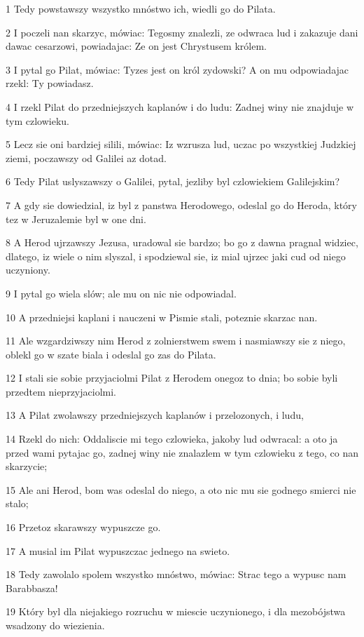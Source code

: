 \par 1 Tedy powstawszy wszystko mnóstwo ich, wiedli go do Pilata.
\par 2 I poczeli nan skarzyc, mówiac: Tegosmy znalezli, ze odwraca lud i zakazuje dani dawac cesarzowi, powiadajac: Ze on jest Chrystusem królem.
\par 3 I pytal go Pilat, mówiac: Tyzes jest on król zydowski? A on mu odpowiadajac rzekl: Ty powiadasz.
\par 4 I rzekl Pilat do przedniejszych kaplanów i do ludu: Zadnej winy nie znajduje w tym czlowieku.
\par 5 Lecz sie oni bardziej silili, mówiac: Iz wzrusza lud, uczac po wszystkiej Judzkiej ziemi, poczawszy od Galilei az dotad.
\par 6 Tedy Pilat uslyszawszy o Galilei, pytal, jezliby byl czlowiekiem Galilejskim?
\par 7 A gdy sie dowiedzial, iz byl z panstwa Herodowego, odeslal go do Heroda, który tez w Jeruzalemie byl w one dni.
\par 8 A Herod ujrzawszy Jezusa, uradowal sie bardzo; bo go z dawna pragnal widziec, dlatego, iz wiele o nim slyszal, i spodziewal sie, iz mial ujrzec jaki cud od niego uczyniony.
\par 9 I pytal go wiela slów; ale mu on nic nie odpowiadal.
\par 10 A przedniejsi kaplani i nauczeni w Pismie stali, poteznie skarzac nan.
\par 11 Ale wzgardziwszy nim Herod z zolnierstwem swem i nasmiawszy sie z niego, oblekl go w szate biala i odeslal go zas do Pilata.
\par 12 I stali sie sobie przyjaciolmi Pilat z Herodem onegoz to dnia; bo sobie byli przedtem nieprzyjaciolmi.
\par 13 A Pilat zwolawszy przedniejszych kaplanów i przelozonych, i ludu,
\par 14 Rzekl do nich: Oddaliscie mi tego czlowieka, jakoby lud odwracal: a oto ja przed wami pytajac go, zadnej winy nie znalazlem w tym czlowieku z tego, co nan skarzycie;
\par 15 Ale ani Herod, bom was odeslal do niego, a oto nic mu sie godnego smierci nie stalo;
\par 16 Przetoz skarawszy wypuszcze go.
\par 17 A musial im Pilat wypuszczac jednego na swieto.
\par 18 Tedy zawolalo spolem wszystko mnóstwo, mówiac: Strac tego a wypusc nam Barabbasza!
\par 19 Który byl dla niejakiego rozruchu w miescie uczynionego, i dla mezobójstwa wsadzony do wiezienia.
